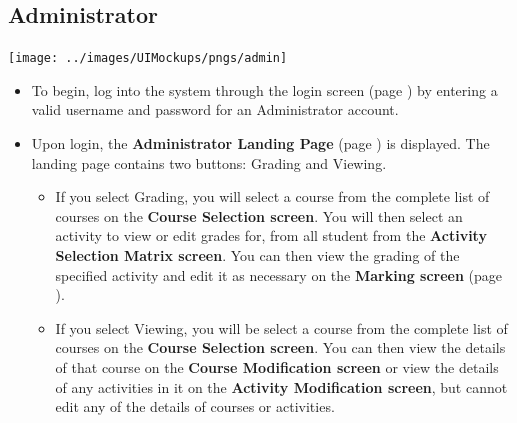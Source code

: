\documentclass{article}
\begin{document}
\subsection{Administrator}
\centerline{\texttt{[image: ../images/UIMockups/pngs/admin]}}
\begin{itemize}
  \item To begin, log into the system through the login screen (page \pageref{login})
    by entering a valid username and password for an Administrator account.
  \item Upon login, the \textbf{Administrator Landing Page} (page \pageref{landPg})
    is displayed. The landing page contains two buttons: Grading and Viewing.
    \begin{itemize}
    \item If you select Grading, you will select a course from the complete list of 
      courses on the \textbf{Course Selection screen}. You will then select an 
      activity to view or edit grades for, from all student from the \textbf{Activity 
	Selection Matrix screen}. You can then view the grading of the specified
      activity and edit it as necessary on the \textbf{Marking screen} (page
      \pageref{marking}).
    \item If you select Viewing, you will be select a course from the complete list of 
      courses on the \textbf{Course Selection screen}. You can then view the
      details of that course on the \textbf{Course Modification screen} or view the
      details of any activities in it on the \textbf{Activity Modification screen}, but
      cannot edit any of the details of courses or activities.
    \end{itemize}
\end{itemize}
\end{document}
